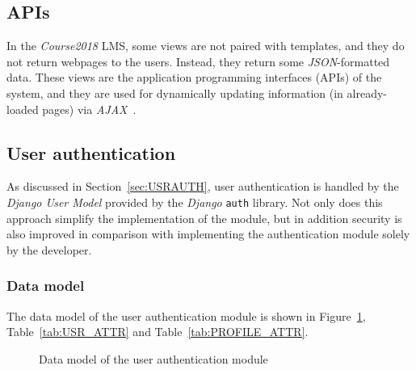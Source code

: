 








\subsection{APIs}
In the \emph{Course2018} LMS, some views are not paired with templates, and
they do not return webpages to the users.
Instead, they return some
\emph{JSON}-formatted data.
These views are the application programming interfaces (APIs) of the system,
and they are used for dynamically updating information (in already-loaded pages)
via \emph{AJAX}~\cite{AJAX}.



\subsection{User authentication}
As discussed in Section~\ref{sec:USRAUTH}, user authentication is handled by the
\emph{Django User Model} provided by the \emph{Django} \texttt{auth} library.
Not only does this approach simplify the implementation of the module,
but in addition security is also improved in comparison with implementing the authentication
module solely by the developer.

\subsubsection{Data model}
The data model of the user authentication module is shown in
Figure~\ref{fig:AUTH_ER}, Table~\ref{tab:USR_ATTR} and
Table~\ref{tab:PROFILE_ATTR}.

\begin{figure}[ht]
    \centering

    \usetikzlibrary{er}

    \caption{Data model of the user authentication module}
    \label{fig:AUTH_ER}
\end{figure}


